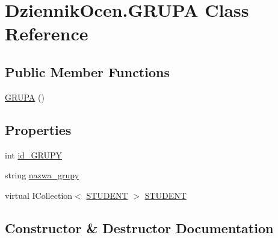 \hypertarget{class_dziennik_ocen_1_1_g_r_u_p_a}{}\section{Dziennik\+Ocen.\+G\+R\+U\+PA Class Reference}
\label{class_dziennik_ocen_1_1_g_r_u_p_a}
\subsection*{Public Member Functions}
\begin{DoxyCompactItemize}
\item 
\hyperlink{class_dziennik_ocen_1_1_g_r_u_p_a_a5fdfaf676d752e14a2a9b6a249714bea}{G\+R\+U\+PA} ()
\end{DoxyCompactItemize}
\subsection*{Properties}
\begin{DoxyCompactItemize}
\item 
int \hyperlink{class_dziennik_ocen_1_1_g_r_u_p_a_a2922dbb8820acec8b3ef6b995953b3ff}{id\+\_\+\+G\+R\+U\+PY}
\item 
string \hyperlink{class_dziennik_ocen_1_1_g_r_u_p_a_ab1d506a5f178511205f684138e99f7fd}{nazwa\+\_\+grupy}
\item 
virtual I\+Collection$<$ \hyperlink{class_dziennik_ocen_1_1_s_t_u_d_e_n_t}{S\+T\+U\+D\+E\+NT} $>$ \hyperlink{class_dziennik_ocen_1_1_g_r_u_p_a_ad8395e769125b74d09b8852af7bdb23f}{S\+T\+U\+D\+E\+NT}
\end{DoxyCompactItemize}


\subsection{Constructor \& Destructor Documentation}
\mbox{\label{class_dziennik_ocen_1_1_g_r_u_p_a_a5fdfaf676d752e14a2a9b6a249714bea}} 

